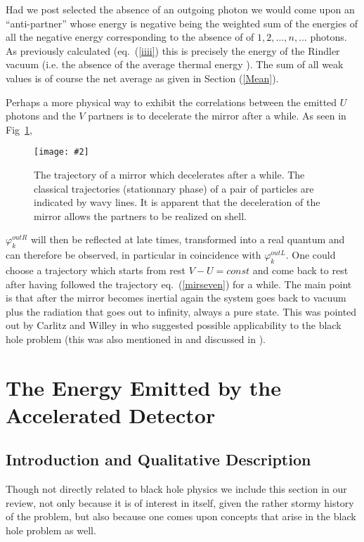 \documentclass[12pt,oneside]{report}
\newcommand{\dessin}[4]
{\begin{figure}[tp]\begin{center}
\texttt{[image: \#2]}%
\end{center}
\caption{#4}
\label{#3}
\end{figure}}
\begin{document}
Had we post selected the absence of an outgoing photon we would come upon 
an ``anti-partner'' whose energy is negative being the weighted sum of the
energies of all the negative energy corresponding to the absence of of
$1,2,\dots,n,\dots$  photons. As previously calculated (eq.~(\ref{iiii}) this is
precisely the energy of the Rindler vacuum (i.e. the absence of the average
thermal energy ). The sum of all weak values is of 
course the net average as given in  Section (\ref{Mean}).


Perhaps a more physical way to exhibit the correlations between the
emitted $U$ photons and the $V$ partners is to decelerate the
mirror after a while. As seen in Fig~\ref{ACCELiii},
\dessin{1.000}{NFIG2-4.eps}{ACCELiii}{
The trajectory of a mirror which decelerates after a
while. The classical trajectories (stationnary phase) of
a pair of particles are indicated by wavy lines. It is
apparent that the deceleration of the mirror allows the
partners to be realized on shell.}
$\varphi_{k}^{out  R}$ will then be reflected at late
times, transformed into a real quantum and can therefore 
be observed, in particular in coincidence
with $\varphi_{k}^{out  L}$. 
One could choose a trajectory which starts
from rest $V-U=const$ and come back to rest  after having followed 
the trajectory eq.~(\ref{mirseven}) for a while. 
The main
point is that after the mirror becomes inertial again the system goes back to
vacuum plus the radiation that goes out to infinity, always a pure state.
This was  pointed out by Carlitz and Willey in 
\cite{Carlitz} 
who suggested possible applicability to
the black hole problem (this was also mentioned in \cite{PaBr} and discussed in
\cite{Wil}).




\section{The  
Energy Emitted by the Accelerated Detector}\label{state}

\subsection{Introduction and Qualitative Description}

Though not directly related to  black hole physics we include this section in
our review, not only because it is of interest in itself, given the rather
stormy history of the problem, but also because one comes upon concepts that
arise in the black hole problem as well.
\end{document}
